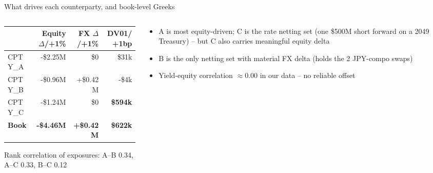 \documentclass[8pt,aspectratio=169]{beamer}
\begin{document}
\begin{frame}{What drives each counterparty, and book-level Greeks}
  \begin{columns}[T]
    \begin{column}{0.55\textwidth}
      \small
      \begin{tabular}{lrrr}
        \toprule
        & \textbf{Equity $\Delta$/+1\%} & \textbf{FX $\Delta$/+1\%} & \textbf{DV01/+1bp} \\
        \midrule
        CPTY\_A & -\$2.25M & \$0 & \$31k \\
        CPTY\_B & -\$0.96M & +\$0.42M & -\$4k \\
        CPTY\_C & -\$1.24M & \$0 & \textbf{\$594k} \\
        \midrule
        \textbf{Book} & \textbf{-\$4.46M} & \textbf{+\$0.42M} & \textbf{\$622k} \\
        \bottomrule
      \end{tabular}
      \vspace{6pt}

      Rank correlation of exposures: A--B 0.34, A--C 0.33, B--C 0.12
    \end{column}
    \begin{column}{0.45\textwidth}
      \small
      \begin{itemize}
        \item A is most equity-driven; C is the rate netting set (one \$500M short forward on a 2049 Treasury) -- but C also carries meaningful equity delta
        \item B is the only netting set with material FX delta (holds the 2 JPY-compo swaps)
        \item Yield-equity correlation $\approx$0.00 in our data -- no reliable offset
      \end{itemize}
    \end{column}
  \end{columns}
\end{frame}
\end{document}
